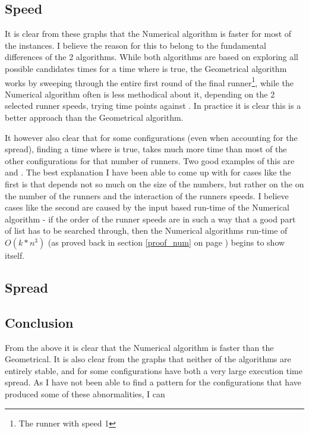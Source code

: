 \subsection{Speed}


It is clear from these graphs that the Numerical algorithm is faster for most of the instances. 
I believe the reason for this to belong to the fundamental differences of the 2 algorithms. While both algorithms are based on exploring all possible candidates times for a time where  is true, the Geometrical algorithm works by sweeping through the entire first round of the final runner\footnote{The runner with speed 1}, while the Numerical algorithm often is less methodical about it, depending on the 2 selected runner speeds, trying time points against . In practice it is clear this is a better approach than the Geometrical algorithm.
 
It however also clear that for some configurations (even when accounting for the spread), finding a time where  is true, takes much more time than most of the other configurations for that number of runners. Two good examples of this are  and . The best explanation I have been able to come up with for cases like the first is that  depends not so much on the size of the numbers, but rather on the on the number of the runners and the interaction of the runners speeds. I believe cases like the second are caused by the input based run-time of the Numerical algorithm - if the order of the runner speeds are in such a way that a good part of list has to be searched through, then the Numerical algorithms run-time of $O(k * n^3)$ (as proved back in section \ref{proof_num} on page \pageref{proof_num}) begins to show itself.  

\subsection{Spread}




\subsection{Conclusion}

From the above it is clear that the Numerical algorithm is faster than the Geometrical. It is also clear from the graphs that neither of the algorithms are entirely stable, and for some configurations have both a very large execution time spread. As I have not been able to find a pattern for the configurations that have produced some of these abnormalities, I can 

